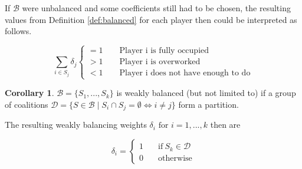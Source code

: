 \documentclass[10pt,a4paper,titlepage]{article}
\theoremstyle{plain}
\theoremstyle{definition}
\newtheorem{corollary}[thm]{Corollary}
\begin{document}
If $\mathcal{B}$ were unbalanced and some coefficients still had to be chosen, the resulting values from Definition \ref{def:balanced} for each player then could be interpreted as follows.\vspace{-15pt}

\begin{equation*}
    \sum_{i \in S_j} \delta_j
    \begin{cases}
        = 1\qquad \text{Player i is fully occupied}\\
        > 1\qquad \text{Player i is overworked}\\
        < 1\qquad \text{Player i does not have enough to do}
    \end{cases}
\end{equation*}

\begin{corollary}\label{cor:weaklybalanced}
    $\mathcal{B} = \{S_1,..., S_k\}$ is weakly balanced (but not limited to) if a group of coalitions $\mathcal{D} = \{S \in \mathcal{B} \mid S_i \cap S_j = \emptyset \Leftrightarrow i \neq j\}$ form a partition.

    The resulting weakly balancing weights $\delta_i \text{ for } i = 1, ..., k$ then are
    
    \begin{equation*}
        \delta_i =
        \begin{cases}
            1 & \quad\text{if}\ S_k \in \mathcal{D}\\
            0 & \quad\text{otherwise}
        \end{cases}
    \end{equation*}
\end{corollary}
\end{document}
